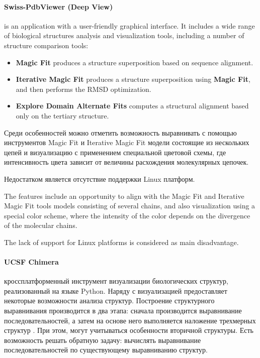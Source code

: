 \documentclass[a4paper, 12pt, titlepage, utf8]{extarticle}
\begin{document}
\begin{original}
\begin{original}
\paragraph{Swiss-PdbViewer (Deep View) \cite{deep-view}}
is an application with a user-friendly graphical interface. It includes a
wide range of biological structures analysis and visualization tools, including
a number of structure comparison tools:
\begin{itemize}
    \item \textbf{Magic Fit} produces a structure superposition based on
sequence alignment.
    \item \textbf{Iterative Magic Fit} produces a structure superposition using
\textbf{Magic Fit}, and then performs the RMSD optimization.
    \item \textbf{Explore Domain Alternate Fits} computes a structural alignment
based only on the tertiary structure.
\end{itemize}

\begin{original}
Среди особенностей можно отметить возможность выравнивать с помощью инструментов
Magic Fit и Iterative Magic Fit модели состоящие из нескольких цепей и
визуализацию с применением специальной цветовой схемы, где интенсивность цвета
зависит от величины расхождения молекулярных цепочек.

Недостатком является отсутствие поддержки Linux платформ.
\end{original}

The features include an opportunity to align with the Magic Fit and Iterative
Magic Fit tools  models consisting of several chains, and also visualization
using a special color scheme, where the intensity of the color depends on the
divergence of the molecular chains.

The lack of support for Linux platforms is considered as main disadvantage.

\begin{original}
\paragraph{UCSF Chimera \cite{chimera}}
кроссплатформенный инструмент визуализации биологических структур, реализованный
на языке Python. Наряду с визуализацией предоставляет некоторые возможности
анализа структур. Построение структурного выравнивания производится в два этапа:
сначала производится выравнивание последовательностей, а затем на основе него
выполняется наложение трехмерных структур \cite{chimera-alignment}. При этом,
могут учитываться особенности вторичной структуры. Есть возможность решать
обратную задачу: вычислять выравнивание последовательностей по существующему
выравниванию структур.
\end{original}


\end{original}
\end{original}
\end{document}
